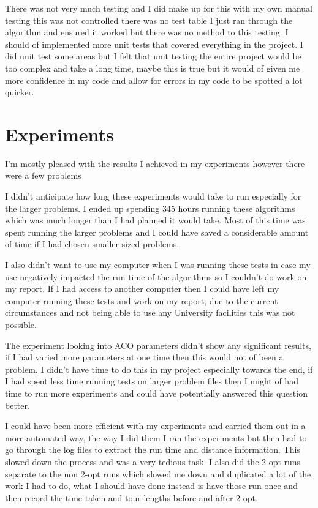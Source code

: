 There was not very much testing and I did make up for this with my own manual testing this was not controlled there was no test table I just ran through the algorithm and ensured it worked but there was no method to this testing. I should of implemented more unit tests that covered everything in the project. I did unit test some areas but I felt that unit testing the entire project would be too complex and take a long time, maybe this is true but it would of given me more confidence in my code and allow for errors in my code to be spotted a lot quicker.

\section{Experiments}

I'm mostly pleased with the results I achieved in my experiments however there were a few problems 

I didn't anticipate how long these experiments would take to run especially for the larger problems. I ended up spending 345 hours running these algorithms which was much longer than I had planned it would take. Most of this time was spent running the larger problems and I could have saved a considerable amount of time if I had chosen smaller sized problems.

I also didn't want to use my computer when I was running these tests in case my use negatively impacted the run time of the algorithms so I couldn't do work on my report. If I had access to another computer then I could have left my computer running these tests and work on my report, due to the current circumstances and not being able to use any University facilities this was not possible.

The experiment looking into ACO parameters didn't show any significant results, if I had varied more parameters at one time then this would not of been a problem. I didn't have time to do this in my project especially towards the end, if I had spent less time running tests on larger problem files then I might of had time to run more experiments and could have potentially answered this question better.

I could have been more efficient with my experiments and carried them out in a more automated way, the way I did them I ran the experiments but then had to go through the log files to extract the run time and distance information. This slowed down the process and was a very tedious task. I also did the 2-opt runs separate to the non 2-opt runs which slowed me down and duplicated a lot of the work I had to do, what I should have done instead is have those run once and then record the time taken and tour lengths before and after 2-opt.

